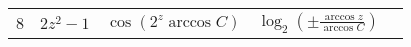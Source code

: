 \begin{table}
\begin{center}
\begin{tabular}{r|l|l|l|c}
8&$2z^2-1		$&$\cos(2^z \arccos C)	$&$\log_2\left(\pm \frac{\arccos z}{\arccos C}\right)	$&\\
\end{tabular}
\end{center}
\label{tabfac1}
\end{table}
